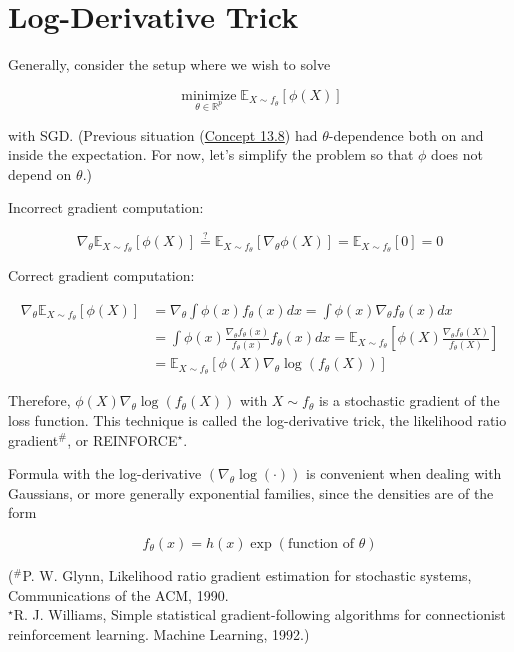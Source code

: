 \documentclass{report}
\begin{document}
\section{Log-Derivative Trick}

\begin{definition}
    Generally, consider the setup where we wish to solve

    $$
    \underset{\theta \in \mathbb{R}^{p}}{\operatorname{minimize}} \mathbb{E}_{X \sim f_{\theta}}[\phi(X)]
    $$

    with SGD.
    (Previous situation (\hyperref[concept:13.8]{Concept 13.8}) had $\theta$-dependence both on and inside the expectation. For now, let's simplify the problem so that $\phi$ does not depend on $\theta$.)

    Incorrect gradient computation:

    $$
    \nabla_{\theta} \mathbb{E}_{X \sim f_{\theta}}[\phi(X)] \stackrel{?}{=} \mathbb{E}_{X \sim f_{\theta}}\left[\nabla_{\theta} \phi(X)\right]=\mathbb{E}_{X \sim f_{\theta}}[0]=0
    $$

    Correct gradient computation:

    $$
    \begin{aligned}
    \nabla_{\theta} \mathbb{E}_{X \sim f_{\theta}}[\phi(X)] & =\nabla_{\theta} \int \phi(x) f_{\theta}(x) d x=\int \phi(x) \nabla_{\theta} f_{\theta}(x) d x \\
    & =\int \phi(x) \frac{\nabla_{\theta} f_{\theta}(x)}{f_{\theta}(x)} f_{\theta}(x) d x=\mathbb{E}_{X \sim f_{\theta}}\left[\phi(X) \frac{\nabla_{\theta} f_{\theta}(X)}{f_{\theta}(X)}\right] \\
    & =\mathbb{E}_{X \sim f_{\theta}}\left[\phi(X) \nabla_{\theta} \log \left(f_{\theta}(X)\right)\right]
    \end{aligned}
    $$

    Therefore, $\phi(X) \nabla_{\theta} \log \left(f_{\theta}(X)\right)$ with $X \sim f_{\theta}$ is a stochastic gradient of the loss function. This technique is called the log-derivative trick, the likelihood ratio gradient$^{\#}$, or REINFORCE$^{\star}$.

    Formula with the log-derivative $\left(\nabla_{\theta} \log (\cdot)\right)$ is convenient when dealing with Gaussians, or more generally exponential families, since the densities are of the form

    $$
    f_{\theta}(x)=h(x) \exp (\text {function of } \theta)
    $$

    (${}^{\#}$P. W. Glynn, Likelihood ratio gradient estimation for stochastic systems, Communications of the ACM, 1990.\\
    ${}^{\star}$R. J. Williams, Simple statistical gradient-following algorithms for connectionist reinforcement learning. Machine Learning, 1992.)
\end{definition}
\end{document}
